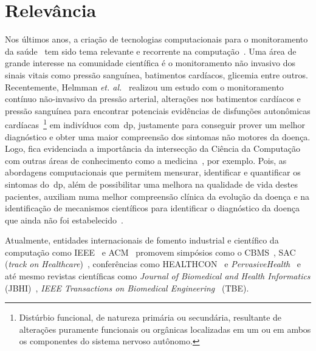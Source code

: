 \section{Relevância}\label{section:relevancia}
Nos últimos anos, a criação de tecnologias computacionais para o monitoramento da saúde~\cite{bardram2008} tem sido tema relevante e recorrente na computação~\cite{bradmonitor2015,compapproachparkinson2015,mazilu2015}. Uma área de grande interesse na comunidade científica é o monitoramento não invasivo dos sinais vitais como pressão sanguínea, batimentos cardíacos, glicemia entre outros. Recentemente, Helmman \textit{et. al.}~\cite{autonomparkin2015} realizou um estudo com o monitoramento contínuo não-invasivo da pressão arterial, alterações nos batimentos cardíacos e pressão sanguínea para encontrar potenciais evidências de disfunções autonômicas cardíacas~\footnote{Distúrbio funcional, de natureza primária ou secundária, resultante de alterações  puramente funcionais ou orgânicas localizadas em um  ou em ambos os componentes do sistema nervoso autônomo.} em indivíduos com~\ac{dp}, justamente para conseguir prover um melhor diagnóstico e obter uma maior compreensão dos sintomas não motores da doença. Logo, fica evidenciada a importância da intersecção da Ciência da Computação com outras áreas de conhecimento como a medicina~\cite{bardram2008}, por exemplo. Pois, as abordagens computacionais que permitem mensurar, identificar e quantificar os sintomas do~\ac{dp}, além de possibilitar uma melhora na qualidade de vida destes pacientes, auxiliam numa melhor compreensão clínica da evolução da doença e na identificação de mecanismos científicos para identificar o diagnóstico da doença que ainda não foi estabelecido~\cite{compapproachparkinson2015}.


Atualmente, entidades internacionais de fomento industrial e científico da computação como IEEE~\cite{ieee2016} e ACM~\cite{acm2016} promovem simpósios como o CBMS~\cite{cbms2016}, SAC (\textit{track on Healthcare})~\cite{sachealth2016}, conferências como HEALTHCON~\cite{healthcon2016} e \textit{PervasiveHealth}~\cite{pervasivehealth2016} e até mesmo revistas científicas como \textit{Journal of Biomedical and Health Informatics} (JBHI)~\cite{jbhi2016}, \textit{IEEE Transactions on Biomedical Engineering}~\cite{tbe2016} (TBE). 

